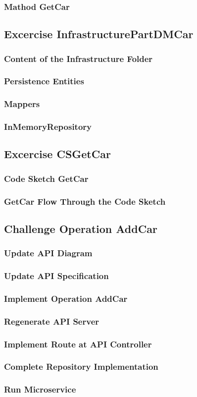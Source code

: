 \subsubsection*{Mathod GetCar}
\subsection{Excercise InfrastructurePartDMCar}
\subsubsection*{Content of the Infrastructure Folder}
\subsubsection*{Persistence Entities}
\subsubsection*{Mappers}
\subsubsection*{InMemoryRepository}

\subsection{Excercise CSGetCar}
\subsubsection*{Code Sketch GetCar}
\subsubsection*{GetCar Flow Through the Code Sketch}

\subsection{Challenge Operation AddCar}
\subsubsection*{Update API Diagram}
\subsubsection*{Update API Specification}
\subsubsection*{Implement Operation AddCar}
\subsubsection*{Regenerate API Server}
\subsubsection*{Implement Route at API Controller}
\subsubsection*{Complete Repository Implementation}
\subsubsection*{Run Microservice}